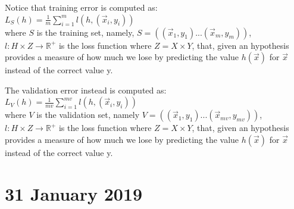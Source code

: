 \documentclass[a4paper,11pt,oneside]{book}
\begin{document}
\begin{solution}
            Notice that training error is computed as: \\ $L_S(h) = \frac{1}{m}\sum_{i=1}^m l(h,(\vec{x}_i,y_i))$ \\ where $S$ is the training set, namely, $S = ((\vec{x}_1,y_1)...(\vec{x}_m,y_m))$, $l: H\times Z \to \mathbb{R}^+$ is the loss function where $Z = X\times Y$, that, given an hypothesis provides a measure of how much we lose by predicting the value $h(\vec{x})$ for $\vec{x}$ instead of the correct value y.

            The validation error instead is computed as: \\ $L_V(h) = \frac{1}{mv}\sum_{i=1}^{mv} l(h,(\vec{x}_i,y_i))$ \\ where $V$ is the validation set, namely $V = ((\vec{x}_1,y_1)...(\vec{x}_{mv},y_{mv}))$, $l: H\times Z \to \mathbb{R}^+$ is the loss function where $Z = X\times Y$, that, given an hypothesis provides a measure of how much we lose by predicting the value $h(\vec{x})$ for $\vec{x}$ instead of the correct value y.
        \end{solution}


\chapter{31 January 2019}
\end{document}
